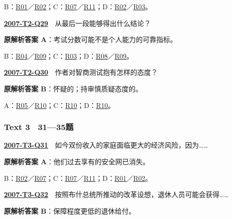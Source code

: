 \documentclass[11pt,a4paper]{article}
\begin{document}
\noindent B：\hyperref[cat-R01]{R01}／\hyperref[cat-R02]{R02}；C：\hyperref[cat-R07]{R07}／\hyperref[cat-R11]{R11}；D：\hyperref[cat-R02]{R02}／\hyperref[cat-R03]{R03}。\par\smallskip
{}\label{idx-2007-T2-Q29}\noindent\textbf{\href{https://zj139.github.io/math-notes/english/eee8045d74a87e7be65b79fe/\#q29}{2007-T2-Q29}}　从最后一段能够得出什么结论？\par\nopagebreak
\noindent\textbf{原解析答案 A}：考试分数可能不是个人能力的可靠指标。\par\nopagebreak
\noindent B：\hyperref[cat-R04]{R04}／\hyperref[cat-R09]{R09}；C：\hyperref[cat-R03]{R03}；D：\hyperref[cat-R08]{R08}／\hyperref[cat-R09]{R09}。\par\smallskip
{}\label{idx-2007-T2-Q30}\noindent\textbf{\href{https://zj139.github.io/math-notes/english/eee8045d74a87e7be65b79fe/\#q30}{2007-T2-Q30}}　作者对智商测试抱有怎样的态度？\par\nopagebreak
\noindent\textbf{原解析答案 B}：怀疑的；持审慎质疑态度的。\par\nopagebreak
\noindent A：\hyperref[cat-R05]{R05}／\hyperref[cat-R10]{R10}；C：\hyperref[cat-R10]{R10}；D：\hyperref[cat-R10]{R10}。\par\smallskip
\clearpage
{}\subsubsection{Text 3　31—35题}
\label{idx-2007-T3-Q31}\noindent\textbf{\href{https://zj139.github.io/math-notes/english/346f4d489f00121c1d163691/\#q31}{2007-T3-Q31}}　如今双份收入的家庭面临更大的经济风险，因为……\par\nopagebreak
\noindent\textbf{原解析答案 A}：他们过去享有的安全网已消失。\par\nopagebreak
\noindent B：\hyperref[cat-R02]{R02}／\hyperref[cat-R07]{R07}；C：\hyperref[cat-R07]{R07}／\hyperref[cat-R11]{R11}；D：\hyperref[cat-R01]{R01}／\hyperref[cat-R02]{R02}。\par\smallskip
{}\label{idx-2007-T3-Q32}\noindent\textbf{\href{https://zj139.github.io/math-notes/english/346f4d489f00121c1d163691/\#q32}{2007-T3-Q32}}　按照布什总统所推动的改革设想，退休人员可能会获得……\par\nopagebreak
\noindent\textbf{原解析答案 B}：保障程度更低的退休给付。\par\nopagebreak
\end{document}

